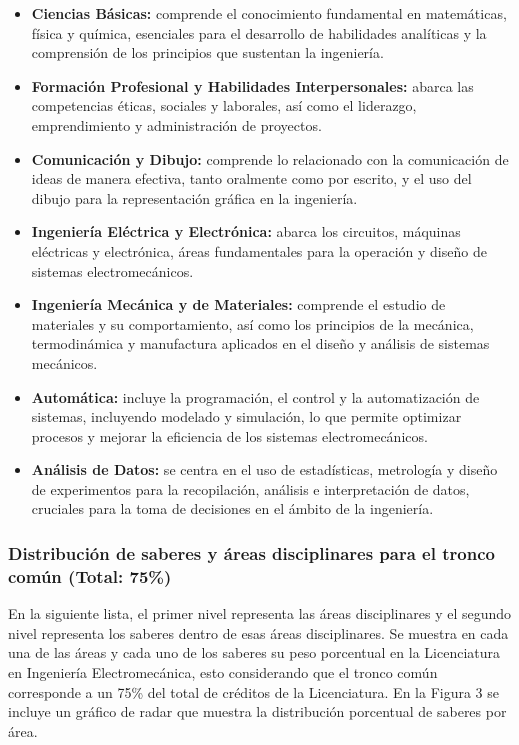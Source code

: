 \begin{itemize}
\item \textbf{Ciencias Básicas:} comprende el conocimiento fundamental en matemáticas, física y química, esenciales para el desarrollo de habilidades analíticas y la comprensión de los principios que sustentan la ingeniería.
\item \textbf{Formación Profesional y Habilidades Interpersonales:} abarca las competencias éticas, sociales y laborales, así como el liderazgo, emprendimiento y administración de proyectos.
\item \textbf{Comunicación y Dibujo: }comprende lo relacionado con la comunicación de ideas de manera efectiva, tanto oralmente como por escrito, y el uso del dibujo para la representación gráfica en la ingeniería.
\item \textbf{Ingeniería Eléctrica y Electrónica:} abarca los circuitos, máquinas eléctricas y electrónica, áreas fundamentales para la operación y diseño de sistemas electromecánicos.
\item \textbf{Ingeniería Mecánica y de Materiales:} comprende el estudio de materiales y su comportamiento, así como los principios de la mecánica, termodinámica y manufactura aplicados en el diseño y análisis de sistemas mecánicos.
\item \textbf{Automática:} incluye la programación, el control y la automatización de sistemas, incluyendo modelado y simulación, lo que permite optimizar procesos y mejorar la eficiencia de los sistemas electromecánicos.
\item \textbf{Análisis de Datos:} se centra en el uso de estadísticas, metrología y diseño de experimentos para la recopilación, análisis e interpretación de datos, cruciales para la toma de decisiones en el ámbito de la ingeniería.
\end{itemize}
\subsubsection*{Distribución de saberes y áreas disciplinares para el tronco común (Total: 75\%)}

En la siguiente lista, el primer nivel representa las áreas disciplinares y el segundo nivel representa los saberes dentro de esas áreas disciplinares. Se muestra en cada una de las áreas y cada uno de los saberes su peso porcentual en la Licenciatura en Ingeniería Electromecánica, esto considerando que el tronco común corresponde a un 75\% del total de créditos de la Licenciatura. En la Figura 3 se incluye un gráfico de radar que muestra la distribución porcentual de saberes por área.\par

